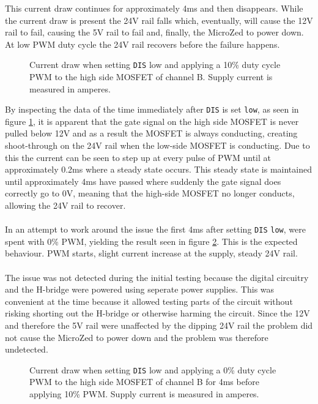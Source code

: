 This current draw continues for approximately 4ms and then disappears.
While the current draw is present the 24V rail falls which, eventually, will cause the 12V rail to fail, causing the 5V rail to fail and, finally, the MicroZed to power down.
At low PWM duty cycle the 24V rail recovers before the failure happens.

\begin{figure}[h]
	\centering
	
	\caption[Main power supply current draw, 10\% duty cycle.]{Current draw when setting \texttt{DIS} low and applying a 10\% duty cycle PWM to the high side MOSFET of channel B. Supply current is measured in amperes.}
	\label{fig:current_w_load_closeup}
\end{figure}

By inspecting the data of the time immediately after \texttt{DIS} is set \texttt{low}, as seen in figure \ref{fig:current_w_load_closeup}, it is apparent that the gate signal on the high side MOSFET is never pulled below 12V and as a result the MOSFET is always conducting, creating shoot-through on the 24V rail when the low-side MOSFET is conducting.
Due to this the current can be seen to step up at every pulse of PWM until at approximately 0.2ms where a steady state occurs.
This steady state is maintained until approximately 4ms have passed where suddenly the gate signal does correctly go to 0V, meaning that the high-side MOSFET no longer conducts, allowing the 24V rail to recover.
\\~\\
In an attempt to work around the issue the first 4ms after setting \texttt{DIS} \texttt{low}, were spent with 0\% PWM, yielding the result seen in figure \ref{fig:current_w_load_slow}.
This is the expected behaviour.
PWM starts, slight current increase at the supply, steady 24V rail.
\\~\\
The issue was not detected during the initial testing because the digital circuitry and the H-bridge were powered using seperate power supplies.
This was convenient at the time because it allowed testing parts of the circuit without risking shorting out the H-bridge or otherwise harming the circuit.
Since the 12V and therefore the 5V rail were unaffected by the dipping 24V rail the problem did not cause the MicroZed to power down and the problem was therefore undetected. 

\begin{figure}[h]
	\centering
	
	\caption[Main power supply current draw, 0\% duty cycle.]{Current draw when setting \texttt{DIS} low and applying a 0\% duty cycle PWM to the high side MOSFET of channel B for 4ms before applying 10\% PWM. Supply current is measured in amperes.}
	\label{fig:current_w_load_slow}
\end{figure}

